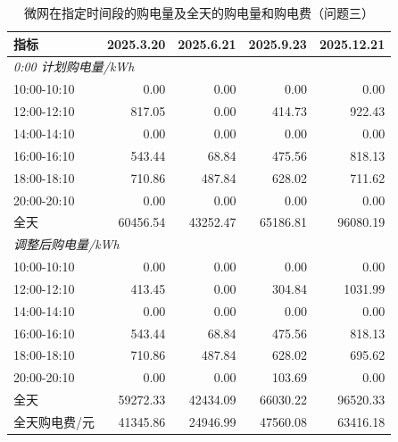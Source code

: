 \begin{table}[H]
\centering
{}
\begin{tabular}{lrrrr}
\toprule
指标 & 2025.3.20 & 2025.6.21 & 2025.9.23 & 2025.12.21 \\
\midrule
\multicolumn{5}{l}{\textit{0:00 计划购电量/kWh}} \\
10:00-10:10 & 0.00 & 0.00 & 0.00 & 0.00 \\
12:00-12:10 & 817.05 & 0.00 & 414.73 & 922.43 \\
14:00-14:10 & 0.00 & 0.00 & 0.00 & 0.00 \\
16:00-16:10 & 543.44 & 68.84 & 475.56 & 818.13 \\
18:00-18:10 & 710.86 & 487.84 & 628.02 & 711.62 \\
20:00-20:10 & 0.00 & 0.00 & 0.00 & 0.00 \\
全天 & 60456.54 & 43252.47 & 65186.81 & 96080.19 \\
\midrule
\multicolumn{5}{l}{\textit{调整后购电量/kWh}} \\
10:00-10:10 & 0.00 & 0.00 & 0.00 & 0.00 \\
12:00-12:10 & 413.45 & 0.00 & 304.84 & 1031.99 \\
14:00-14:10 & 0.00 & 0.00 & 0.00 & 0.00 \\
16:00-16:10 & 543.44 & 68.84 & 475.56 & 818.13 \\
18:00-18:10 & 710.86 & 487.84 & 628.02 & 695.62 \\
20:00-20:10 & 0.00 & 0.00 & 103.69 & 0.00 \\
全天 & 59272.33 & 42434.09 & 66030.22 & 96520.33 \\
\midrule
全天购电费/元 & 41345.86 & 24946.99 & 47560.08 & 63416.18 \\
\bottomrule
\end{tabular}
\caption{微网在指定时间段的购电量及全天的购电量和购电费（问题三）}
\label{tab:m1-q3}
\end{table}
